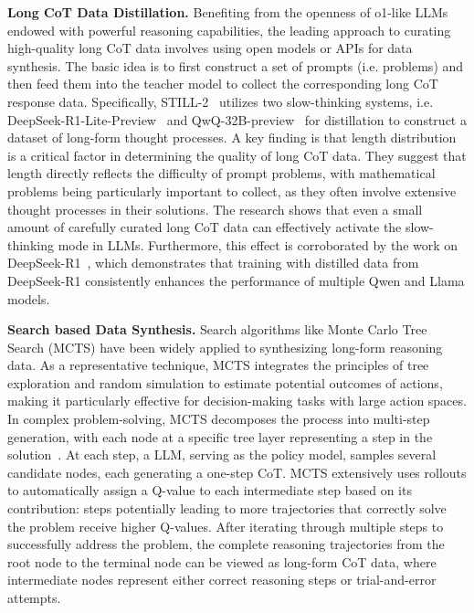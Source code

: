 \textbf{Long CoT Data Distillation.} Benefiting from the openness of o1-like LLMs endowed with powerful reasoning capabilities, the leading approach to curating high-quality long CoT data involves using open models or APIs for data synthesis. The basic idea is to first construct a set of prompts (i.e. problems) and then feed them into the teacher model to collect the corresponding long CoT response data. Specifically, STILL-2~\cite{Min-arxiv-2024-Imitate} utilizes two slow-thinking systems, i.e. DeepSeek-R1-Lite-Preview~\cite{DeepSeek-arxiv-2024-Deepseek} and QwQ-32B-preview~\cite{Qwen-arxiv-2024-Qwq} for distillation to construct a dataset of long-form thought processes. A key finding is that length distribution is a critical factor in determining the quality of long CoT data. They suggest that length directly reflects the difficulty of prompt problems, with mathematical problems being particularly important to collect, as they often involve extensive thought processes in their solutions. The research shows that even a small amount of carefully curated long CoT data can effectively activate the slow-thinking mode in LLMs. Furthermore, this effect is corroborated by the work on DeepSeek-R1~\cite{Deepseek-arxiv-2025-DeepSeek}, which demonstrates that training with distilled data from DeepSeek-R1 consistently enhances the performance of multiple Qwen and Llama models.

\textbf{Search based Data Synthesis.} Search algorithms like Monte Carlo Tree Search (MCTS) \cite{Silver-nat-2017-Mastering} have been widely applied to synthesizing long-form reasoning  data. As a representative technique, MCTS integrates the principles of tree exploration and random simulation to estimate potential outcomes of actions, making it particularly effective for decision-making tasks with large action spaces. In complex problem-solving, MCTS decomposes the process into multi-step generation, with each node at a specific tree layer representing a step in the solution~\cite{jiang-2024-arxiv-still1}. At each step, a LLM, serving as the policy model, samples several candidate nodes, each generating a one-step CoT. MCTS extensively uses rollouts to automatically assign a Q-value to each intermediate step based on its contribution: steps potentially leading to more trajectories that correctly solve the problem receive higher Q-values. After iterating through multiple steps to successfully address the problem, the complete reasoning trajectories from the root node to the terminal node can be viewed as long-form CoT data, where intermediate nodes represent either correct reasoning steps or trial-and-error attempts.

